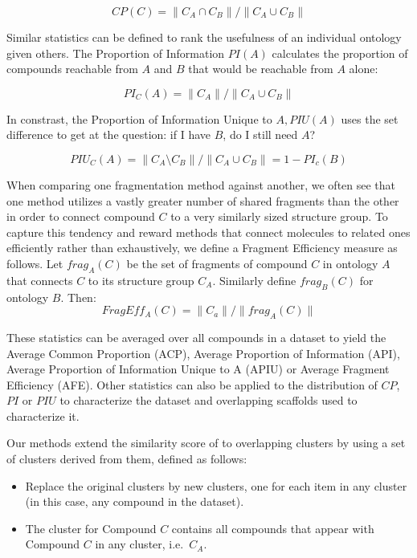 \documentclass[journal=jacsat,manuscript=article]{achemso}
\newcommand*\ie{i.e.~}
\begin{document}
\begin{equation}
CP(C) = \| C_A \cap C_B \| / \| C_A \cup C_B \|
\end{equation}

Similar statistics can be defined to rank the usefulness of an individual ontology given others. The Proportion of Information $PI(A)$ calculates the proportion of compounds reachable from $A$ and $B$ that would be reachable from $A$ alone:

\begin{equation}
PI_C(A) = \| C_A \| / \| C_A \cup C_B \|
\end{equation}

In constrast, the Proportion of Information Unique to $A, PIU(A)$ uses the set difference to get at the question: if I have $B$, do I still need $A$? 

\begin{equation}
 PIU_C(A) = \| C_A \setminus C_B \| / \| C_A \cup C_B \| = 1 - PI_c(B)
 \end{equation}
  
When comparing one fragmentation method against another, we often see that one method utilizes a vastly greater number of shared fragments than the other in order to connect compound $C$ to a very similarly sized structure group. To capture this tendency and reward methods that connect molecules to related ones efficiently rather than exhaustively, we define a Fragment Efficiency measure as follows. Let $frag_A(C)$ be the set of fragments of compound $C$ in ontology $A$ that connects $C$ to its structure group $C_A$. Similarly define $frag_B(C)$ for ontology $B$. Then: 
\begin{equation}
FragEff_A(C) = \| C_a \| / \| frag_A(C) \|
\end{equation}


These statistics can be averaged over all compounds in a dataset to yield the Average Common Proportion (ACP), Average Proportion of Information (API), Average Proportion of Information Unique to A (APIU) or Average Fragment Efficiency (AFE).  Other statistics can also be applied to the distribution of $CP$, $PI$ or $PIU$ to characterize the dataset and overlapping scaffolds used to characterize it.

Our methods extend the similarity score of \citeauthor{Torres2009} to
overlapping clusters by using a set of clusters
derived from them, defined as follows:
\begin{itemize}
\item Replace the original clusters by new clusters, one for each item
  in any cluster (in this case, any compound in the dataset).
\item The cluster for Compound $C$ contains all compounds that appear
  with Compound $C$ in any cluster, \ie $C_A$.
\end{itemize}
\end{document}
